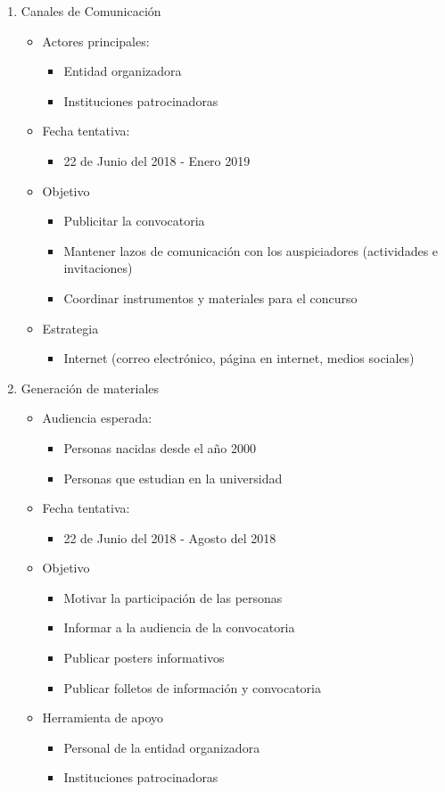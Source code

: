 \documentclass{article}
\begin{document}
\begin{enumerate}
\item Canales de Comunicación 
\begin{itemize}
\item Actores principales:
\begin{itemize}
\item Entidad organizadora
\item Instituciones patrocinadoras
\end{itemize}
\item Fecha tentativa:
\begin{itemize}
\item 22 de Junio del 2018 - Enero 2019
\end{itemize}
\item Objetivo
\begin{itemize}
\item Publicitar la convocatoria
\item Mantener lazos de comunicación con los auspiciadores (actividades e invitaciones)
\item Coordinar instrumentos y materiales para el concurso
\end{itemize}
\item Estrategia
\begin{itemize}
\item Internet (correo electrónico, página en internet, medios sociales)
\end{itemize}
\end{itemize}

\item Generación de materiales
\begin{itemize}
\item Audiencia esperada:
\begin{itemize}
\item Personas nacidas desde el año 2000
\item Personas que estudian en la universidad
\end{itemize}
\item Fecha tentativa:
\begin{itemize}
\item 22 de Junio del 2018 - Agosto del 2018
\end{itemize}
\item Objetivo
\begin{itemize}
\item Motivar la participación de las personas
\item Informar a la audiencia de la convocatoria
\item Publicar posters informativos
\item Publicar folletos de información y convocatoria
\end{itemize}
\item Herramienta de apoyo
\begin{itemize}
\item Personal de la entidad organizadora 
\item Instituciones patrocinadoras
\end{itemize}
\end{itemize}


\end{enumerate}
\end{document}
